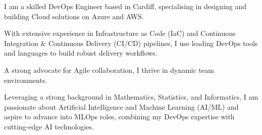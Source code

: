 
\vspace{0.25cm}

\begin{small}
  I am a skilled DevOps Engineer based in Cardiff, specialising in designing and building Cloud solutions on Azure and AWS.

  \vspace{0.5cm}

  With extensive experience in Infrastructure as Code (IaC) and Continuous Integration \& Continuous Delivery (CI/CD) pipelines, I use leading DevOps tools and languages to build robust delivery workflows.

  \vspace{0.5cm}

  A strong advocate for Agile collaboration, I thrive in dynamic team environments.

  \vspace{0.5cm}

  Leveraging a strong background in Mathematics, Statistics, and Informatics, I am passionate about Artificial Intelligence and Machine Learning (AI/ML) and aspire to advance into MLOps roles, combining my DevOps expertise with cutting-edge AI technologies.
\end{small}
